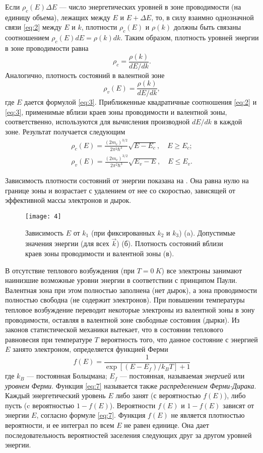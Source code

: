 \documentclass[a4paper, 12pt]{article}
\begin{document}
Если $\rho_{c}(E)\Delta E$ --- число энергетических уровней в зоне
проводимости (на единицу объема), лежащих между $E$ и $E+\Delta E$,
то, в силу взаимно однозначной связи \eqref{eq:2}  между $E$ и $k$, плотности
$\rho_{c}(E)$ и $\rho(k)$ должны быть связаны соотношением
$\rho_{c}(E)dE=\rho(k)dk$. Таким образом, плотность уровней энергии в
зоне проводимости равна 
\[
    \rho_{c}= \frac{\rho(k)}{dE/dk}.
\]
Аналогично, плотность состояний в валентной зоне 
\[
    \rho_{v}(E) = \frac{\rho(k)}{dE/dk},
\]
где $E$ дается формулой \eqref{eq:3}. Приближенные квадратичные
соотношения \eqref{eq:2} и \eqref{eq:3}, применимые вблизи краев зоны
проводимости и валентной зоны, соответственно, используются для
вычисления производной $dE/dk$ в каждой зоне. Результат получается
следующим
    \begin{align}
        \rho_{c}(E) = \frac{(2m_{c})^{3/2}}{2\pi^2
        \hbar^3}\sqrt{E-E_{c}},\hspace{1em} E \ge E_{c};\\
        \rho_{v}(E) = \frac{(2m_{c})^{3/2}}{2\pi^2
        \hbar^3}\sqrt{E_{v}-E},\hspace{1em} E \le E_{v}.
    \end{align}

Зависимость плотности состояний от энергии показана на .
Она равна нулю на границе зоны и возрастает с удалением от нее со
скоростью, зависящей от эффективной массы электронов и дырок.


\begin{figure}[H]
    \texttt{[image: 4]} 
    \caption{Зависимость $E$ от $k_{1}$ (при фиксированных $k_{2}$ и
    $k_{3}$) (a). Допустимые значения энергии (для всех $\vec{k}$)
(б). Плотность состояний вблизи краев зоны проводимости и валентной
зоны (в).}
\label{fig:4}
\end{figure}

В отсутствие теплового возбуждения (при $T=0\: K$) все электроны
занимают наинизшие возможные уровни энергии в соответствии с принципом
Паули. Валентная зона при этом полностью заполнена (нет дырок), а зона
проводимости полностью свободна (не содержит электронов). При
повышении температуры тепловое возбуждение переводит некоторые
электроны из валентной зоны в зону проводимости, оставляя в валентной
зоне свободные состояния (дырки). Из законов статистической механики
вытекает, что в состоянии теплового равновесия при температуре $T$
вероятность того, что данное состояние с энергией $E$ занято
электроном, определяется функцией Ферми
\begin{equation}
    f(E) = \frac{1}{\exp \left[\left(E-E_{f}\right)/k_{B}T\right]+1}
    \label{eq:7}
\end{equation}
где $k_{B}$ --- постоянная Больцмана; $E_{f}$ --- постоянная,
называемая \emph{энергией} или \emph{уровнем} \emph{Ферми}. Функция
\eqref{eq:7} называется также \emph{распределением Ферми-Дирака}.
Каждый энергетический уровень $E$ либо занят (с вероятностью $f(E)$),
либо пусть (c вероятностью $1-f(E)$). Вероятности $f(E)$ и $1-f(E)$
зависят от энергии $E$, согласно формуле \eqref{eq:7}. Функция $f(E)$
не является плотностью вероятности, и ее интеграл по всем $E$ не равен
единице. Она дает последовательность вероятностей заселения следующих
друг за другом уровней энергии.
\end{document}
